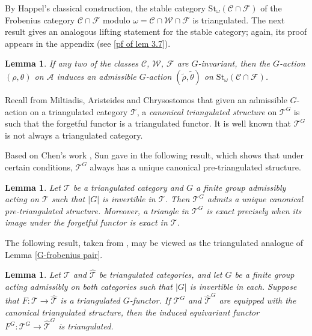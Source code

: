 \documentclass[12pt,twoside]{amsart}
\theoremstyle{bfupright head,slanted body}
\theoremstyle{bfupright head,upright body}
\theoremstyle{fixed bf head,slanted body}
\newtheorem{lem}[res]{Lemma}            \newtheorem*{lem*}{Lemma}
\theoremstyle{fixed bf head,upright body}
\theoremstyle{numbered paragraph}
\newcommand{\prpcite}[2][?]{\cite[Proposition~#1]{#2}}
\newcommand{\lemcite}[2][?]{\cite[Lemma~#1]{#2}}
\newcommand{\dfncite}[2][?]{\cite[Definition~#1]{#2}}
\numberwithin{equation}{res}
\newcommand{\calC}{\mathcal{C}}
\newcommand{\calW}{\mathcal{W}}
\newcommand{\calF}{\mathcal{F}}
\newcommand{\calA}{\mathcal{A}}
\newcommand{\calT}{\mathcal{T}}
\newcommand{\St}{\mathrm{St}}
\begin{document}
By Happel's classical construction, the stable category \(\St_\omega(\calC\cap\calF)\) of the Frobenius category \(\calC\cap\calF\) modulo \(\omega=\calC\cap\calW\cap\calF\) is triangulated. The next result gives an analogous lifting statement for the stable category; again, its proof appears in the appendix (see \ref{pf of lem 3.7}).

\begin{lem} \label{admiss for St(C cap F)}
If any two of the classes \(\calC\), \(\calW\), \(\calF\) are \(G\)-invariant, then the \(G\)-action \((\rho,\theta)\) on \(\calA\) induces an admissible \(G\)-action \((\widetilde{\rho},\widetilde{\theta})\) on \(\St_\omega(\calC\cap\calF)\).
\end{lem}

Recall from Miltiadis, Aristeides and Chrysostomos \dfncite[2.21]{2025Equ} that given an admissible $G$-action on a triangulated category $\calT$, a \emph{canonical triangulated structure} on $\calT^G$ is such that the forgetful functor is a triangulated functor. It is well known that $\calT^G$ is not always a triangulated category.

Based on Chen's work \cite{2015Chen}, Sun gave in \prpcite[3.3]{2019Sun} the following result, which shows that under certain conditions, $\calT^G$ always has a unique canonical pre-triangulated structure.

\begin{lem} \label{G-pre-tri stru}
Let $\calT$ be a triangulated category and $G$ a finite group admissibly acting on $\calT$ such that $|G|$ is invertible in $\calT$.
Then $\calT^G$ admits a unique canonical pre-triangulated structure.
Moreover, a triangle in \(\calT^G\) is exact precisely when its image under the forgetful functor is exact in \(\calT\).
\end{lem}

The following result, taken from \lemcite[2.23]{2025Equ}, may be viewed as the triangulated analogue of Lemma \ref{G-frobenius pair}.

\begin{lem} \label{G-tri fun}
Let $\calT$ and $\widehat{\calT}$ be triangulated categories, and let $G$ be a finite group acting admissibly on both categories such that $|G|$ is invertible in each.
Suppose that $F : \calT \to \widehat{\calT}$ is a triangulated $G$-functor.
If $\calT^G$ and $\widehat{\calT}^G$ are equipped with the canonical triangulated structure, then the induced equivariant functor $F^G : \calT^G \to \widehat{\calT}^G$ is triangulated.
\end{lem}
\end{document}
